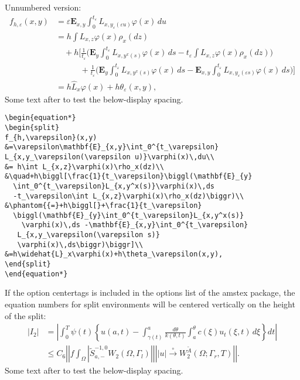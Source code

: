 \documentclass[draft]{amsart}
\newcommand{\ntt}{\normalfont\ttfamily}
\newcommand{\pkg}[1]{{\protect\ntt#1}}
\newcommand{\env}[1]{{\protect\ntt#1}}
\theoremstyle{definition}
\theoremstyle{remark}
\begin{document}
\newpage
Unnumbered version:
\begin{equation*}
\begin{split}
f_{h,\varepsilon}(x,y)
&=\varepsilon\mathbf{E}_{x,y}\int_0^{t_\varepsilon}
L_{x,y_\varepsilon(\varepsilon u)}\varphi(x)\,du\\
&= h\int L_{x,z}\varphi(x)\rho_x(dz)\\
&\quad+h\biggl[\frac{1}{t_\varepsilon}\biggl(\mathbf{E}_{y}
  \int_0^{t_\varepsilon}L_{x,y^x(s)}\varphi(x)\,ds
  -t_\varepsilon\int L_{x,z}\varphi(x)\rho_x(dz)\biggr)\\
&\phantom{{=}+h\biggl[}+\frac{1}{t_\varepsilon}
  \biggl(\mathbf{E}_{y}\int_0^{t_\varepsilon}L_{x,y^x(s)}
    \varphi(x)\,ds -\mathbf{E}_{x,y}\int_0^{t_\varepsilon}
   L_{x,y_\varepsilon(\varepsilon s)}
   \varphi(x)\,ds\biggr)\biggr]\\
&=h\widehat{L}_x\varphi(x)+h\theta_\varepsilon(x,y),
\end{split}
\end{equation*}
Some text after to test the below-display spacing.

\begin{verbatim}
\begin{equation*}
\begin{split}
f_{h,\varepsilon}(x,y)
&=\varepsilon\mathbf{E}_{x,y}\int_0^{t_\varepsilon}
L_{x,y_\varepsilon(\varepsilon u)}\varphi(x)\,du\\
&= h\int L_{x,z}\varphi(x)\rho_x(dz)\\
&\quad+h\biggl[\frac{1}{t_\varepsilon}\biggl(\mathbf{E}_{y}
  \int_0^{t_\varepsilon}L_{x,y^x(s)}\varphi(x)\,ds
  -t_\varepsilon\int L_{x,z}\varphi(x)\rho_x(dz)\biggr)\\
&\phantom{{=}+h\biggl[}+\frac{1}{t_\varepsilon}
  \biggl(\mathbf{E}_{y}\int_0^{t_\varepsilon}L_{x,y^x(s)}
    \varphi(x)\,ds -\mathbf{E}_{x,y}\int_0^{t_\varepsilon}
   L_{x,y_\varepsilon(\varepsilon s)}
   \varphi(x)\,ds\biggr)\biggr]\\
&=h\widehat{L}_x\varphi(x)+h\theta_\varepsilon(x,y),
\end{split}
\end{equation*}
\end{verbatim}

\newpage
If the option \env{centertags} is included in the options
list of the \pkg{amstex} package,
the equation numbers for \env{split} environments will be
centered vertically on the height
of  the \env{split}:
{\makeatletter\ctagsplit@true
\begin{equation}
\begin{split}
 |I_2|&=\left|\int_{0}^T \psi(t)\left\{u(a,t)-\int_{\gamma(t)}^a
  \frac{d\theta}{k(\theta,t)}
  \int_{a}^\theta c(\xi)u_t(\xi,t)\,d\xi\right\}dt\right|\\
&\le C_6\left|\left|f\int_\Omega\left|\widetilde{S}^{-1,0}_{a,-}
  W_2(\Omega,\Gamma_l)\right|\right|
  \left||u|\overset{\circ}\to W_2^{\widetilde{A}}
  (\Omega;\Gamma_r,T)\right|\right|.
\end{split}
\end{equation}}%
Some text after to test the below-display spacing.
\end{document}
